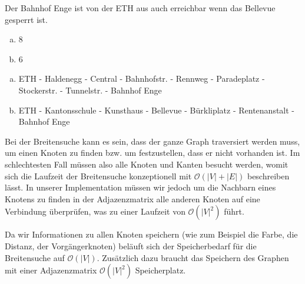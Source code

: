 \begin{lsg}
Der Bahnhof Enge ist von der ETH aus auch erreichbar wenn das Bellevue gesperrt ist.
\end{lsg}

\begin{lsg}
\hfill
\begin{enumerate}[(a)]
\item 8
\item 6
\end{enumerate}\end{lsg}

\begin{lsg}
\hfill
\begin{enumerate}[(a)]
\item ETH - Haldenegg - Central - Bahnhofstr. - Rennweg - Paradeplatz - Stockerstr. - Tunnelstr. - Bahnhof Enge
\item ETH - Kantonsschule - Kunsthaus - Bellevue - B\"urkliplatz - Rentenanstalt - Bahnhof Enge
\end{enumerate}\end{lsg}

\begin{lsg}
Bei der Breitensuche kann es sein, dass der ganze Graph traversiert werden muss, um einen Knoten zu finden bzw. um festzustellen, dass er nicht vorhanden ist. Im schlechtesten Fall m\"ussen also alle Knoten und Kanten besucht werden, womit sich die Laufzeit der Breitensuche konzeptionell mit $\mathcal{O}(|V| + |E|)$ beschreiben l\"asst. In unserer Implementation m\"ussen wir jedoch um die Nachbarn eines Knotens zu finden in der Adjazenzmatrix alle anderen Knoten auf eine Verbindung \"uberpr\"ufen, was zu einer Laufzeit von $\mathcal{O}(|V|^2)$ f\"uhrt.
\end{lsg}

\begin{lsg}
Da wir Informationen zu allen Knoten speichern (wie zum Beispiel die Farbe, die Distanz, der Vorg\"angerknoten) bel\"auft sich der Speicherbedarf f\"ur die Breitensuche auf  $\mathcal{O}(|V|)$. Zus\"atzlich dazu braucht das Speichern des Graphen mit einer Adjazenzmatrix $\mathcal{O}(|V|^2)$ Speicherplatz.
\end{lsg}




